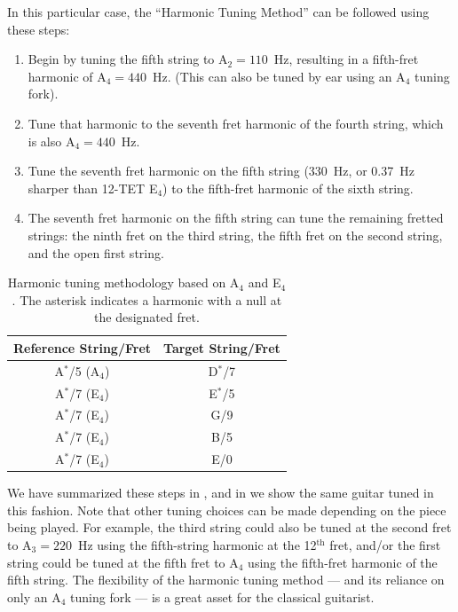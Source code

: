In this particular case, the ``Harmonic Tuning Method'' can be followed using these steps:
 \begin{enumerate}
  \item Begin by tuning the fifth string to A$_2 = 110$~Hz, resulting in a fifth-fret harmonic of A$_4 = 440$~Hz. (This can also be tuned by ear using an A$_4$ tuning fork).
  \item Tune that harmonic to the seventh fret harmonic of the fourth string, which is also A$_4 = 440$~Hz.
  \item Tune the seventh fret harmonic on the fifth string (330~Hz, or 0.37~Hz sharper than 12-TET E$_4$) to the fifth-fret harmonic of the sixth string.
  \item The seventh fret harmonic on the fifth string can tune the remaining fretted strings: the ninth fret on the third string, the fifth fret on the second string, and the open first string.
 \end{enumerate}
 \begin{table}[htbp]
  \centering
  \caption{\label{tbl:harmonic_tuning} Harmonic tuning methodology based on A$_4$ and E$_4$. The asterisk indicates a harmonic with a null at the designated fret.}
    \begin{tabular}{cc}
    \toprule
    Reference String/Fret &  Target String/Fret \\
    \midrule
     A$^\ast$/5 (A$_4$) & D$^\ast$/7 \\
     A$^\ast$/7 (E$_4$) & E$^\ast$/5 \\
     A$^\ast$/7 (E$_4$) & G/9 \\
     A$^\ast$/7 (E$_4$) & B/5 \\
     A$^\ast$/7 (E$_4$) & E/0 \\
    \bottomrule
    \end{tabular}
 \end{table}%
We have summarized these steps in , and in  we show the same guitar tuned in this fashion. Note that other tuning choices can be made depending on the piece being played. For example, the third string could also be tuned at the second fret to A$_3 = 220$~Hz using the fifth-string harmonic at the 12$^\text{th}$ fret, and/or the first string could be tuned at the fifth fret to A$_4$ using the fifth-fret harmonic of the fifth string. The flexibility of the harmonic tuning method --- and its reliance on only an A$_4$ tuning fork --- is a great asset for the classical guitarist.


